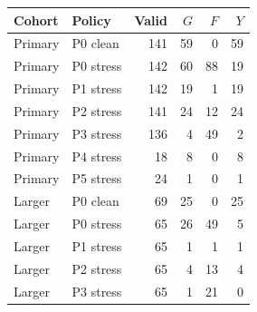 \begin{tabular}{@{}llrrrr@{}}\toprule
Cohort & Policy & Valid & $G$ & $F$ & $Y$\\\midrule
Primary & P0 clean & 141 & 59 & 0 & 59\\
Primary & P0 stress & 142 & 60 & 88 & 19\\
Primary & P1 stress & 142 & 19 & 1 & 19\\
Primary & P2 stress & 141 & 24 & 12 & 24\\
Primary & P3 stress & 136 & 4 & 49 & 2\\
Primary & P4 stress & 18 & 8 & 0 & 8\\
Primary & P5 stress & 24 & 1 & 0 & 1\\
Larger & P0 clean & 69 & 25 & 0 & 25\\
Larger & P0 stress & 65 & 26 & 49 & 5\\
Larger & P1 stress & 65 & 1 & 1 & 1\\
Larger & P2 stress & 65 & 4 & 13 & 4\\
Larger & P3 stress & 65 & 1 & 21 & 0\\
\bottomrule
\end{tabular}
